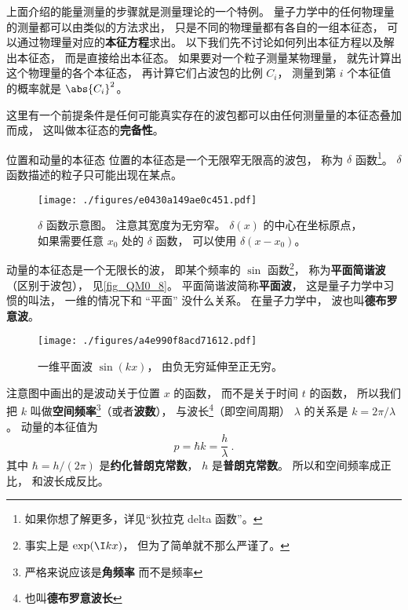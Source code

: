 上面介绍的能量测量的步骤就是测量理论的一个特例。 量子力学中的任何物理量的测量都可以由类似的方法求出， 只是不同的物理量都有各自的一组本征态， 可以通过物理量对应的\textbf{本征方程}求出。 以下我们先不讨论如何列出本征方程以及解出本征态， 而是直接给出本征态。 如果要对一个粒子测量某物理量， 就先计算出这个物理量的各个本征态， 再计算它们占波包的比例 $C_i$， 测量到第 $i$ 个本征值的概率就是 $\abs{C_i}^2$。

这里有一个前提条件是任何可能真实存在的波包都可以由任何测量量的本征态叠加而成， 这叫做本征态的\textbf{完备性}。

\begin{example}{位置和动量的本征态}
位置的本征态是一个无限窄无限高的波包， 称为 $\delta$ 函数\footnote{如果你想了解更多，详见“狄拉克 delta 函数”。}。 $\delta$ 函数描述的粒子只可能出现在某点。 
\begin{figure}[ht]
\centering
\texttt{[image: ./figures/e0430a149ae0c451.pdf]}
\caption{$\delta$ 函数示意图。 注意其宽度为无穷窄。 $\delta(x)$ 的中心在坐标原点， 如果需要任意 $x_0$ 处的 $\delta$ 函数， 可以使用 $\delta(x - x_0)$。} \label{fig_QM0_9} %
\end{figure}

动量的本征态是一个无限长的波， 即某个频率的 $\sin$ 函数\footnote{事实上是 $\exp(\I kx)$， 但为了简单就不那么严谨了。}， 称为\textbf{平面简谐波}（区别于波包）， 见\autoref{fig_QM0_8}。 平面简谐波简称\textbf{平面波}， 这是量子力学中习惯的叫法， 一维的情况下和 “平面” 没什么关系。 在量子力学中， 波也叫\textbf{德布罗意波}。

\begin{figure}[ht]
\centering
\texttt{[image: ./figures/a4e990f8acd71612.pdf]}
\caption{一维平面波 $\sin(kx)$， 由负无穷延伸至正无穷。} \label{fig_QM0_8}
\end{figure}

注意图中画出的是波动关于位置 $x$ 的函数， 而不是关于时间 $t$ 的函数， 所以我们把 $k$ 叫做\textbf{空间频率}\footnote{严格来说应该是\textbf{角频率} 而不是频率}（或者\textbf{波数}）， %
与波长\footnote{也叫\textbf{德布罗意波长}}（即空间周期） $\lambda$ 的关系是 $k = 2\pi/\lambda$。 动量的本征值为
\begin{equation}\label{eq_QM0_1}
p = \hbar k = \frac{h}{\lambda}~.
\end{equation}
其中 $\hbar = h / (2\pi)$ 是\textbf{约化普朗克常数}， $h$ 是\textbf{普朗克常数}。 所以和空间频率成正比， 和波长成反比。
\end{example}

